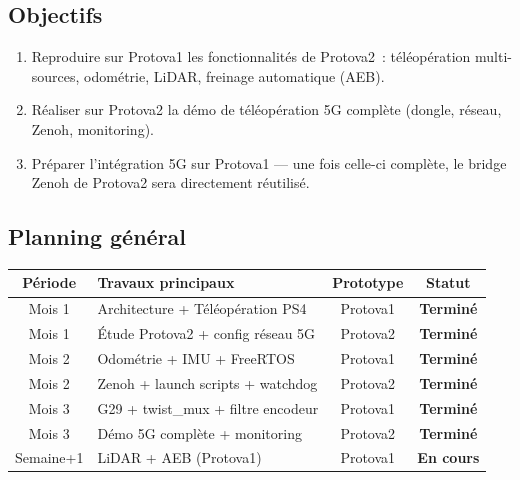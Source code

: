 \documentclass[a4paper,11pt]{article}
\begin{document}
\subsection{Objectifs}

\begin{enumerate}[noitemsep]
  \item Reproduire sur Protova1 les fonctionnalités de Protova2~: téléopération
        multi-sources, odométrie, LiDAR, freinage automatique (AEB).
  \item Réaliser sur Protova2 la démo de téléopération 5G complète (dongle,
        réseau, Zenoh, monitoring).
  \item Préparer l'intégration 5G sur Protova1 — une fois celle-ci complète, le
        bridge Zenoh de Protova2 sera directement réutilisé.
\end{enumerate}

\subsection{Planning général}

\begin{center}
\begin{tabularx}{\textwidth}{@{}cXcc@{}}
\toprule
\textbf{Période} & \textbf{Travaux principaux} & \textbf{Prototype} & \textbf{Statut} \\
\midrule
Mois 1 & Architecture + Téléopération PS4 & Protova1 & \textcolor{success}{\textbf{Terminé}} \\
Mois 1 & Étude Protova2 + config réseau 5G & Protova2 & \textcolor{success}{\textbf{Terminé}} \\
Mois 2 & Odométrie + IMU + FreeRTOS & Protova1 & \textcolor{success}{\textbf{Terminé}} \\
Mois 2 & Zenoh + launch scripts + watchdog & Protova2 & \textcolor{success}{\textbf{Terminé}} \\
Mois 3 & G29 + twist\_mux + filtre encodeur & Protova1 & \textcolor{success}{\textbf{Terminé}} \\
Mois 3 & Démo 5G complète + monitoring & Protova2 & \textcolor{success}{\textbf{Terminé}} \\
Semaine+1 & LiDAR + AEB (Protova1) & Protova1 & \textcolor{warning}{\textbf{En cours}} \\
\bottomrule
\end{tabularx}
\end{center}


\newpage
\end{document}
